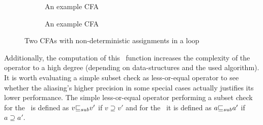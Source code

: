 \begin{figure}[t]
\begin{subfigure}[b]{.48\textwidth}
\caption{An example CFA}
\label{fig:loopNondetAssign1}
\end{subfigure}%
\hfill
\begin{subfigure}[b]{.48\textwidth}
\caption{An example CFA}
\label{fig:loopNondetAssign2}
\end{subfigure}
\caption{Two CFAs with non-deterministic assignments in a loop}
\end{figure}

Additionally, the computation of this \aliasFunc\ function increases the complexity of the operator to a high degree (depending on data-structures and the used algorithm).
It is worth evaluating a simple subset check as less-or-equal operator to see whether the aliasing's higher precision in some special cases actually justifies its lower performance.
The simple less-or-equal operator performing a subset check for the \symbolicValueAnalysisCPA\ is defined as $v {\sqsubseteq_{sub}} v'$ if $v \supseteq v'$
and for the \constraintsCPA\ it is defined as $a {\sqsubseteq_{sub}} a'$ if $a \supseteq a'$.


